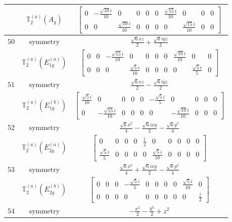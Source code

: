 \documentclass[fleqn,8pt,landscape]{jsarticle}
\begin{document}
\begin{longtable}{ccc}
$  $ & $ \mathbb{T}_{2}^{(a)}(A_{g}) $ & $ \begin{bmatrix} 0 & - \frac{\sqrt{10} i}{10} & 0 & 0 & 0 & 0 & \frac{\sqrt{15} i}{10} & 0 & 0 & 0 \\ 0 & 0 & \frac{\sqrt{10} i}{10} & 0 & 0 & 0 & 0 & \frac{\sqrt{15} i}{10} & 0 & 0 \end{bmatrix} $ \\ \hline
$ 50 $ & $ \text{symmetry} $ & $ \frac{\sqrt{6} x z}{2} + \frac{\sqrt{6} i y z}{2} $ \\
$  $ & $ \mathbb{T}_{2}^{(a)}(E_{1g}^{(a)}) $ & $ \begin{bmatrix} 0 & 0 & - \frac{\sqrt{15} i}{10} & 0 & 0 & 0 & 0 & \frac{\sqrt{10} i}{10} & 0 & 0 \\ 0 & 0 & 0 & \frac{\sqrt{5} i}{10} & 0 & 0 & 0 & 0 & \frac{\sqrt{5} i}{5} & 0 \end{bmatrix} $ \\ \hline
$ 51 $ & $ \text{symmetry} $ & $ \frac{\sqrt{6} x z}{2} - \frac{\sqrt{6} i y z}{2} $ \\
$  $ & $ \mathbb{T}_{2}^{(a)}(E_{1g}^{(b)}) $ & $ \begin{bmatrix} \frac{\sqrt{5} i}{10} & 0 & 0 & 0 & 0 & - \frac{\sqrt{5} i}{5} & 0 & 0 & 0 & 0 \\ 0 & - \frac{\sqrt{15} i}{10} & 0 & 0 & 0 & 0 & - \frac{\sqrt{10} i}{10} & 0 & 0 & 0 \end{bmatrix} $ \\ \hline
$ 52 $ & $ \text{symmetry} $ & $ \frac{\sqrt{6} x^{2}}{4} - \frac{\sqrt{6} i x y}{2} - \frac{\sqrt{6} y^{2}}{4} $ \\
$  $ & $ \mathbb{T}_{2}^{(a)}(E_{2g}^{(a)}) $ & $ \begin{bmatrix} 0 & 0 & 0 & 0 & \frac{i}{2} & 0 & 0 & 0 & 0 & 0 \\ \frac{\sqrt{5} i}{5} & 0 & 0 & 0 & 0 & \frac{\sqrt{5} i}{10} & 0 & 0 & 0 & 0 \end{bmatrix} $ \\ \hline
$ 53 $ & $ \text{symmetry} $ & $ \frac{\sqrt{6} x^{2}}{4} + \frac{\sqrt{6} i x y}{2} - \frac{\sqrt{6} y^{2}}{4} $ \\
$  $ & $ \mathbb{T}_{2}^{(a)}(E_{2g}^{(b)}) $ & $ \begin{bmatrix} 0 & 0 & 0 & - \frac{\sqrt{5} i}{5} & 0 & 0 & 0 & 0 & \frac{\sqrt{5} i}{10} & 0 \\ 0 & 0 & 0 & 0 & 0 & 0 & 0 & 0 & 0 & \frac{i}{2} \end{bmatrix} $ \\ \hline
$ 54 $ & $ \text{symmetry} $ & $ - \frac{x^{2}}{2} - \frac{y^{2}}{2} + z^{2} $ \\

\end{longtable}
\end{document}
